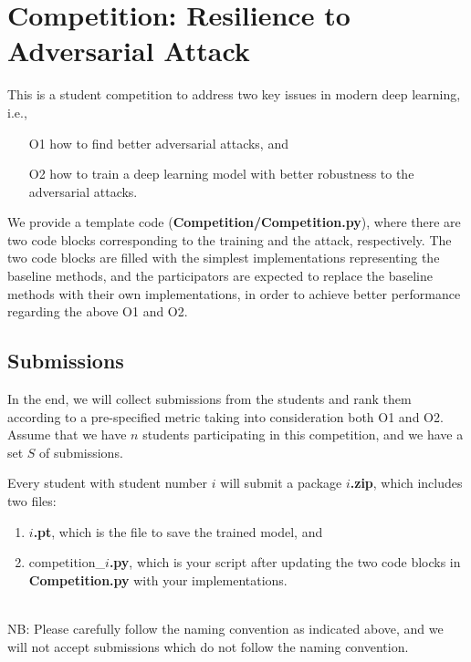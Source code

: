 \chapter{Competition: Resilience to Adversarial Attack}\label{sec:competitionresilience}

This is a student competition to address two key issues in modern deep learning, i.e., 
\begin{itemize}
    \item[O1] how to find better adversarial attacks, and
    \item[O2] how to train a deep learning model with better robustness to the adversarial attacks.
\end{itemize}
We provide a template code (\textbf{Competition/Competition.py}), where there are two code blocks corresponding to the training and the attack, respectively. The two code blocks are filled with the simplest implementations representing the baseline methods, and the participators are expected to replace the baseline methods with their own implementations, in order to achieve better performance regarding the above O1 and O2. 

\section{Submissions}

In the end, we will collect submissions from the students and rank them according to a pre-specified metric taking into consideration both O1 and O2. 
%
Assume that we have $n$ students participating in this competition, and we have a set $S$ of submissions.

\vspace{1em}
\begin{tcolorbox}
Every student with student number $i$ will submit a  package \textbf{$i$.zip},  which includes two files:
\begin{enumerate}
    \item $i$\textbf{.pt}, which is the file to save the trained model, and
    \item competition\_$i$\textbf{.py}, which is your  script after updating the two code blocks in \textbf{Competition.py} with your implementations.  
\end{enumerate}  \\NB: Please carefully follow the naming convention as indicated above, and we will not accept submissions which do not follow the naming convention. 
\end{tcolorbox}


